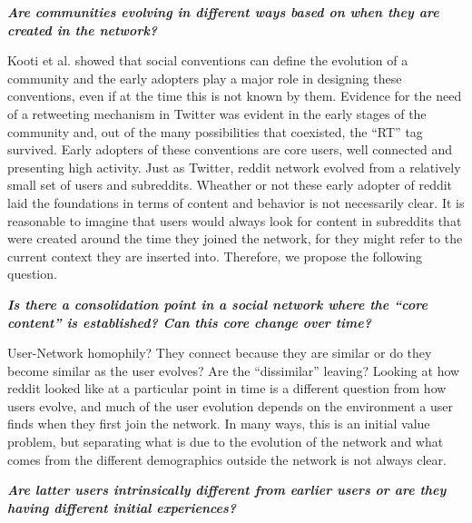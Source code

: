 \textbf{\textit{Are communities evolving in different ways based on when they are created in the network?}}

Kooti et al. \cite{Kooti2010} showed that social conventions can define the evolution of a community and the early adopters play a major role in designing these conventions, even if at the time this is not known by them. Evidence for the need of a retweeting mechanism in Twitter was evident in the early stages of the community and, out of the many possibilities that coexisted, the ``RT'' tag survived. Early adopters of these conventions are core users, well connected and presenting high activity. Just as Twitter, reddit network evolved from a relatively small set of users and subreddits. Wheather or not these early adopter of reddit laid the foundations in terms of content and behavior is not necessarily clear. It is reasonable to imagine that users would always look for content in subreddits that were created around the time they joined the network, for they might refer to the current context they are inserted into. Therefore, we propose the following question.

\textbf{\textit{Is there a consolidation point in a social network where the ``core content'' is established? Can this core change over time?}}

User-Network homophily? They connect because they are similar or do they become similar as the user evolves? Are the ``dissimilar'' leaving?
Looking at how reddit looked like at a particular point in time is a different question from how users evolve, and much of the user evolution depends on the environment a user finds when they first join the network. In many ways, this is an initial value problem, but separating what is due to the evolution of the network and what comes from the different demographics outside the network is not always clear.

\textbf{\textit{Are latter users intrinsically different from earlier users or are they having different initial experiences?}}
